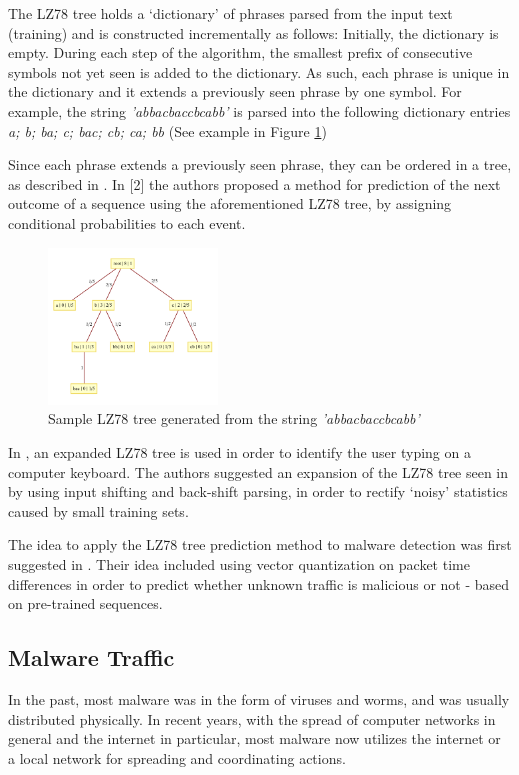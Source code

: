 \documentclass[9pt,journal,compsoc]{IEEEtran}
\begin{document}
The LZ78 tree holds a ‘dictionary’ of phrases parsed from the input text (training) and is constructed incrementally as follows:
Initially, the dictionary is empty. During each step of the algorithm, the smallest prefix of consecutive symbols not yet seen is added to the dictionary. As such, each phrase is unique in the dictionary and it extends a previously seen phrase by one symbol.
For example, the string \emph{'abbacbaccbcabb'} is parsed into the following dictionary entries \emph{a; b; ba; c; bac; cb; ca; bb} (See example in Figure \ref{fig:lztree})

Since each phrase extends a previously seen phrase, they can be ordered in a tree, as described in \cite{Lan83}. In [2] the authors proposed a method for prediction of the next outcome of a sequence using the aforementioned LZ78 tree, by assigning conditional probabilities to each event.
\begin{figure}[!ht]
 \centering
 \includegraphics[width=0.40\textwidth]{sampletree.pdf}
 \caption{Sample LZ78 tree generated from the string \emph{'abbacbaccbcabb'}\label{fig:lztree}}
\end{figure} 
In \cite{Nis03}, an expanded LZ78 tree is used in order to identify the user typing on a computer keyboard. The authors suggested an expansion of the LZ78 tree seen in \cite{Lan83} by using input shifting and back-shift parsing, in order to rectify ‘noisy’ statistics caused by small training sets.

The idea to apply the LZ78 tree prediction method to malware detection was first suggested in \cite{Coh12}. Their idea included using vector quantization on packet time differences in order to predict whether unknown traffic is malicious or not - based on pre-trained sequences.


\subsection{Malware Traffic}
\label{sec:malwaretraffic}
In the past, most malware was in the form of viruses and worms, and was usually distributed physically. In recent years, with the spread of computer networks in general and the internet in particular, most malware now utilizes the internet or a local network for spreading and coordinating actions.
\end{document}
